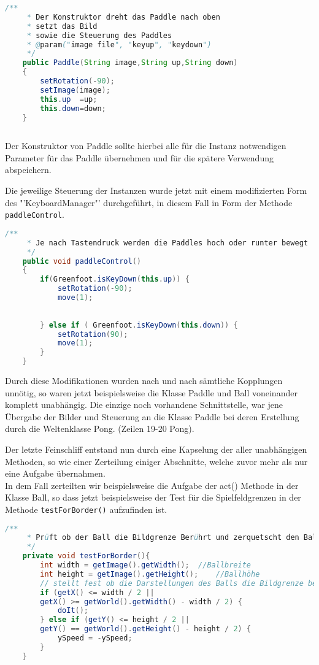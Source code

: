 \documentclass{pi1}
\begin{document}
\begin{lstlisting}[caption={Konstruktor Paddle}, firstnumber=27, language=Java]
/**
     * Der Konstruktor dreht das Paddle nach oben
     * setzt das Bild
     * sowie die Steuerung des Paddles
     * @param("image file", "keyup", "keydown")
     */
    public Paddle(String image,String up,String down)
    {
        setRotation(-90);
        setImage(image);
        this.up  =up;
        this.down=down;
    }
    
\end{lstlisting}
Der Konstruktor von Paddle sollte hierbei alle für die Instanz notwendigen Parameter für das Paddle übernehmen und für die spätere Verwendung abspeichern.

Die jeweilige Steuerung der Instanzen wurde jetzt mit einem modifizierten Form des "'KeyboardManager"' durchgeführt, in diesem Fall in Form der Methode \texttt{paddleControl}.
\begin{lstlisting}[caption={Methode \emph{paddleControl()} der Klasse Paddle}, firstnumber=58, language=Java]
/**
     * Je nach Tastendruck werden die Paddles hoch oder runter bewegt
     */
    public void paddleControl() 
    {
        if(Greenfoot.isKeyDown(this.up)) {
            setRotation(-90);
            move(1);
            
            
        } else if ( Greenfoot.isKeyDown(this.down)) {
            setRotation(90);
            move(1);
        }
    }
\end{lstlisting}
Durch diese Modifikationen wurden nach und nach sämtliche Kopplungen unnötig, so waren jetzt beispielsweise die Klasse Paddle und Ball voneinander komplett unabhängig.
Die einzige noch vorhandene Schnittstelle, war jene Übergabe der Bilder und Steuerung an die Klasse Paddle bei deren Erstellung durch die Weltenklasse Pong. (Zeilen 19-20 Pong).\newline

Der letzte Feinschliff entstand nun durch eine Kapselung der aller unabhängigen Methoden,
so wie einer Zerteilung einiger Abschnitte, welche zuvor mehr als nur eine Aufgabe übernahmen.\\
In dem Fall zerteilten wir beispielsweise die Aufgabe der act() Methode in der Klasse Ball, so dass jetzt beispielsweise der Test für die Spielfeldgrenzen in der Methode \texttt{testForBorder()} aufzufinden ist.

\begin{lstlisting}[caption={\emph{testForBorder()} Methode in Ball}, firstnumber=123, language=Java]
/**
     * Prüft ob der Ball die Bildgrenze Berührt und zerquetscht den Ball falls dem so ist.
     */
    private void testForBorder(){
        int width = getImage().getWidth();  //Ballbreite
        int height = getImage().getHeight();    //Ballhöhe
        // stellt fest ob die Darstellungen des Balls die Bildgrenze berührt
        if (getX() <= width / 2 ||  
        getX() >= getWorld().getWidth() - width / 2) {
            doIt();
        } else if (getY() <= height / 2 ||
        getY() == getWorld().getHeight() - height / 2) {
            ySpeed = -ySpeed;
        }
    }
\end{lstlisting}
\end{document}

